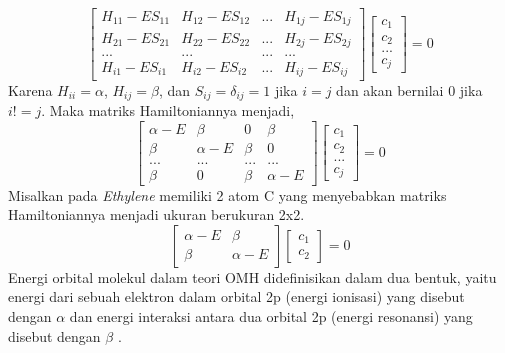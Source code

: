 \documentclass[12pt,a4paper]{report}
\begin{document}
	\begin{equation}
	\begin{bmatrix}
	{H_{11}-ES_{11}} & {H_{12}-ES_{12}} & ... &{H_{1j}-ES_{1j}}\\
	{H_{21}-ES_{21}} & {H_{22}-ES_{22}} & ... &{H_{2j}-ES_{2j}}\\
	... & ... & ... & ... \\
	{H_{i1}-ES_{i1}} & {H_{i2}-ES_{i2}} & ... &{H_{ij}-ES_{ij}}
	\end{bmatrix}
	\begin{bmatrix}c_1 \\ c_2 \\ ... \\ c_j \end{bmatrix} = 0
	\end{equation}
	Karena {$H_{ii} = \alpha$}, {$H_{ij} = \beta$}, dan {$S_{ij} = \delta_{ij} = 1$} jika {$i=j$} dan akan bernilai 0 jika {$i!=j$}. Maka matriks Hamiltoniannya menjadi,
	\begin{equation}
	\begin{bmatrix}
	\label{hamiltonian}
	\alpha - E & \beta & 0 &\beta \\
	\beta & \alpha - E & \beta & 0\\
	... & ... & ... & ... \\
	\beta & 0 & \beta & \alpha - E
	\end{bmatrix}
	\begin{bmatrix}c_1 \\ c_2 \\ ... \\ c_j \end{bmatrix} = 0
	\end{equation}
	Misalkan pada \textit{Ethylene} memiliki 2 atom C yang menyebabkan matriks Hamiltoniannya menjadi ukuran berukuran 2x2.
	\begin{equation}
	\begin{bmatrix}
	\alpha - E & \beta \\
	\beta & \alpha - E
	\end{bmatrix}
	\begin{bmatrix}c_1 \\ c_2 \end{bmatrix} = 0
	\end{equation}
	Energi orbital molekul dalam teori OMH didefinisikan dalam dua bentuk, yaitu energi dari sebuah elektron dalam orbital 2p (energi ionisasi) yang disebut dengan {$\alpha$} dan energi interaksi antara dua orbital 2p (energi resonansi) yang disebut dengan {$\beta$} \cite{Anil}\cite{Rustaman2008}.
	
\end{document}
